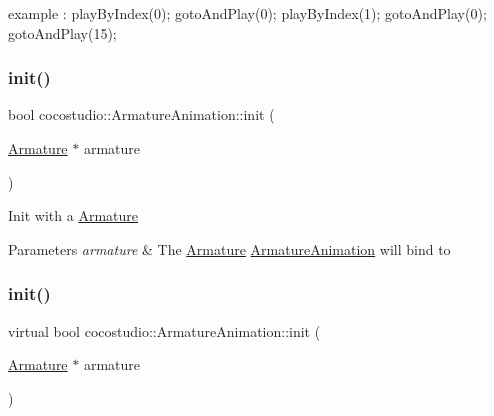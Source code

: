example \+: play\+By\+Index(0); goto\+And\+Play(0); play\+By\+Index(1); goto\+And\+Play(0); goto\+And\+Play(15); \mbox{\label{classcocostudio_1_1ArmatureAnimation_a678f0d6943b3ca51590a97f83b2f7ebf}} 
\subsubsection{\texorpdfstring{init()}{init()}\hspace{0.1cm}{\footnotesize\ttfamily [1/2]}}
{\footnotesize\ttfamily bool cocostudio\+::\+Armature\+Animation\+::init (\begin{DoxyParamCaption}\item[{\hyperlink{classcocostudio_1_1Armature}{Armature} $\ast$}]{armature }\end{DoxyParamCaption})\hspace{0.3cm}{\ttfamily [virtual]}}

Init with a \hyperlink{classcocostudio_1_1Armature}{Armature} 
\begin{DoxyParams}{Parameters}
{\em armature} & The \hyperlink{classcocostudio_1_1Armature}{Armature} \hyperlink{classcocostudio_1_1ArmatureAnimation}{Armature\+Animation} will bind to \\
\hline
\end{DoxyParams}
\mbox{\label{classcocostudio_1_1ArmatureAnimation_a04acd23e81652c65fc6bd766135b0eaf}} 
\subsubsection{\texorpdfstring{init()}{init()}\hspace{0.1cm}{\footnotesize\ttfamily [2/2]}}
{\footnotesize\ttfamily virtual bool cocostudio\+::\+Armature\+Animation\+::init (\begin{DoxyParamCaption}\item[{\hyperlink{classcocostudio_1_1Armature}{Armature} $\ast$}]{armature }\end{DoxyParamCaption})\hspace{0.3cm}{\ttfamily [virtual]}}

